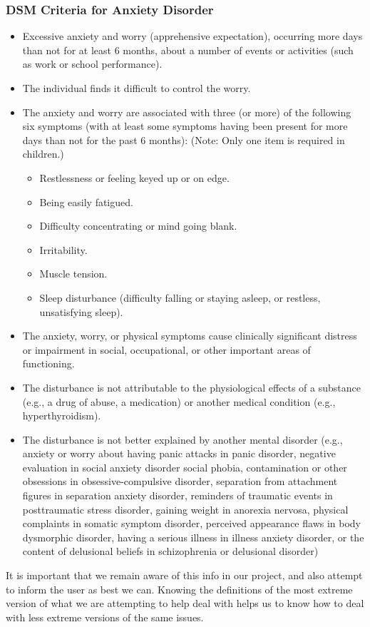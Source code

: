 \documentclass[a4paper,10pt]{article}
\begin{document}
\subsubsection{DSM Criteria for Anxiety Disorder}
\begin{itemize}
	\item Excessive anxiety and worry (apprehensive expectation), occurring more days than not for at least 6 months, about a number of events or activities (such as work or school performance).
	\item The individual finds it difficult to control the worry.
	\item The anxiety and worry are associated with three (or more) of the following six symptoms (with at least some symptoms having been present for more days than not for the past 6 months):
	(Note: Only one item is required in children.)
	\begin{itemize}
		\item Restlessness or feeling keyed up or on edge.
		\item Being easily fatigued.
		\item Difficulty concentrating or mind going blank.
		\item Irritability.
		\item Muscle tension.
		\item Sleep disturbance (difficulty falling or staying asleep, or restless, unsatisfying sleep).
	\end{itemize}
	
	\item The anxiety, worry, or physical symptoms cause clinically significant distress or impairment in social, occupational, or other important areas of functioning.
	\item The disturbance is not attributable to the physiological effects of a substance (e.g., a drug of abuse, a medication) or another medical condition (e.g., hyperthyroidism).
	\item The disturbance is not better explained by another mental disorder (e.g., anxiety or worry about having panic attacks in panic disorder, negative evaluation in social anxiety
	disorder social phobia, contamination or other obsessions in obsessive-compulsive disorder, separation from attachment figures in separation anxiety disorder, reminders of traumatic
	events in posttraumatic stress disorder, gaining weight in anorexia nervosa, physical complaints in somatic symptom disorder, perceived appearance flaws in body dysmorphic disorder,
	having a serious illness in illness anxiety disorder, or the content of delusional beliefs in schizophrenia or delusional disorder)\cite{dsmAnxiety}
\end{itemize}
It is important that we remain aware of this info in our project, and also attempt to inform the user as best we can.  Knowing the definitions of the most extreme version of what we are
attempting to help deal with helps us to know how to deal with less extreme versions of the same issues.
\par
\end{document}
